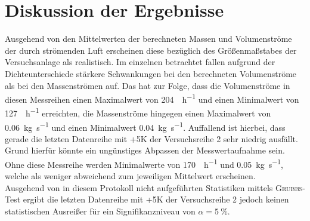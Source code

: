 \newpage
\section{Diskussion der Ergebnisse}
\label{sec:diskussion}

Ausgehend von den Mittelwerten der berechneten Massen und Volumenströme der durch strömenden Luft erscheinen diese bezüglich des Größenmaßstabes der Versuchsanlage als realistisch. Im einzelnen betrachtet fallen aufgrund der Dichteunterschiede stärkere Schwankungen bei den berechneten Volumenströme als bei den Massenströmen auf. Das hat zur Folge, dass die Volumenströme in diesen Messreihen einen Maximalwert von \SI{204}{\kmeter \per \hour } und einen Minimalwert von \SI{127}{\kmeter\per \hour} erreichten, die Massenströme hingegen einen Maximalwert von \SI{0,06}{\kg \per \second} und einen Minimalwert \SI{0,04}{\kg \per \second}. Auffallend ist hierbei, dass gerade die letzten Datenreihe mit +5K der Versuchsreihe 2 sehr niedrig ausfällt. Grund hierfür könnte ein ungünstiges Abpassen der Messwertaufnahme sein. Ohne diese Messreihe werden Minimalwerte von \SI{170}{\kmeter \per \hour} und \SI{0,05}{\kg \per \second}, welche als weniger abweichend zum jeweiligen Mittelwert erscheinen.\\
Ausgehend von in diesem Protokoll nicht aufgeführten Statistiken mittels \textsc{Grubbs}-Test ergibt die letzten Datenreihe mit +5K der Versuchsreihe 2 jedoch keinen statistischen Ausreißer für ein Signifikanzniveau von $\alpha =\SI{5}{\percent}$.\\

